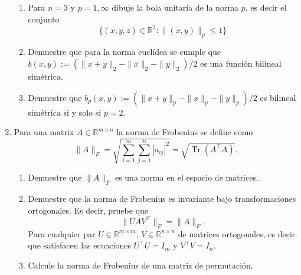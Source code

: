 \documentclass[11pt]{article}
\newcommand{\RR}{\mathbb{R}}
\begin{document}
\begin{enumerate}
\begin{enumerate}
\item Para $n=3$ y $p=1,\infty$ dibuje la bola unitaria de la norma $p$, es decir el conjunto
\[\{(x,y,z)\in \RR^3: \|(x,y)\|_p\leq 1\}\]

\item Demuestre que para la norma euclídea se cumple que $b(x,y):=(\|x+y\|_2-\|x\|_2-\|y\|_2)/2$ es una función bilineal simétrica. 

\item Demuestre que  $b_p(x,y):=(\|x+y\|_p-\|x\|_p-\|y\|_p)/2$ es bilineal simétrica si y solo si $p=2$.
\end{enumerate}


\item  Para una matrix $A \in \mathbb{R}^{m \times n}$ la norma de Frobenius se define como 
\[
\|A\|_F = \sqrt{\sum_{i=1}^m \sum_{j=1}^n |a_{ij}|^2} = \sqrt{\operatorname{Tr}(A^\top A)}.
\]
\begin{enumerate}
\item Demuestre que $\|A\|_F$ es una norma en el espacio de matrices.

\item Demuestre que la norma de Frobenius es invariante bajo transformaciones ortogonales. Es decir, pruebe que
\[
\|U A V^\top\|_F = \|A\|_F.
\]
Para cualquier par  \( U \in \mathbb{R}^{m \times m} \), \( V \in \mathbb{R}^{n \times n} \) de matrices ortogonales, es decir que satisfacen las ecuaciones \( U^\top U = I_m \) y \( V^\top V = I_n \).

\item Calcule la norma de Frobenius de una matriz de permutación.

\end{enumerate}

 
\end{enumerate}
\end{document}
